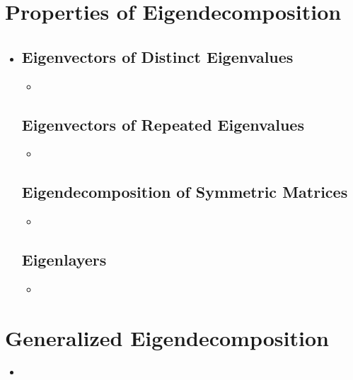 \section{Properties of Eigendecomposition}\label{Properties of Eigendecomposition}
\begin{itemize}
  \item []
  
  \subsection{Eigenvectors of Distinct Eigenvalues}\label{Eigenvectors of Distinct Eigenvalues}
  \begin{itemize}
    \item 
  \end{itemize}
  
  \subsection{Eigenvectors of Repeated Eigenvalues}\label{Eigenvectors of Repeated Eigenvalues}
  \begin{itemize}
    \item 
  \end{itemize}

  \subsection{Eigendecomposition of Symmetric Matrices}\label{Eigendecomposition of Symmetric Matrices}
  \begin{itemize}
    \item 
  \end{itemize}
  
  \subsection{Eigenlayers}\label{Eigenlayers}
  \begin{itemize}
    \item 
  \end{itemize}
  
\end{itemize}

\section{Generalized Eigendecomposition}\label{Generalized Eigendecomposition}
\begin{itemize}
  \item 
\end{itemize}


